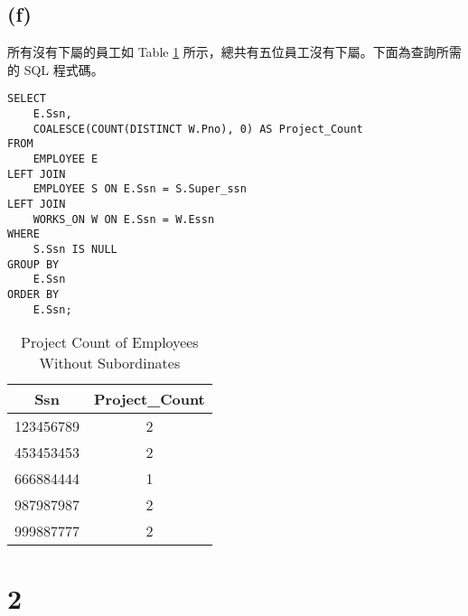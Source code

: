 \documentclass{article}
\begin{document}
\subsection*{(f)}
所有沒有下屬的員工如 Table \ref{table:1_f} 所示，總共有五位員工沒有下屬。下面為查詢所需的 SQL 程式碼。
\begin{verbatim}
SELECT 
    E.Ssn,
    COALESCE(COUNT(DISTINCT W.Pno), 0) AS Project_Count  
FROM 
    EMPLOYEE E
LEFT JOIN 
    EMPLOYEE S ON E.Ssn = S.Super_ssn
LEFT JOIN 
    WORKS_ON W ON E.Ssn = W.Essn
WHERE 
    S.Ssn IS NULL
GROUP BY 
    E.Ssn
ORDER BY 
    E.Ssn;
\end{verbatim}
\begin{table}[H]
\centering
\begin{tabular}{cc}
\toprule
Ssn & Project\_Count \\
\midrule
123456789 & 2 \\
453453453 & 2 \\
666884444 & 1 \\
987987987 & 2 \\
999887777 & 2 \\
\bottomrule
\end{tabular}
\caption{Project Count of Employees Without Subordinates}
\label{table:1_f}
\end{table}







\section*{2}
\end{document}
